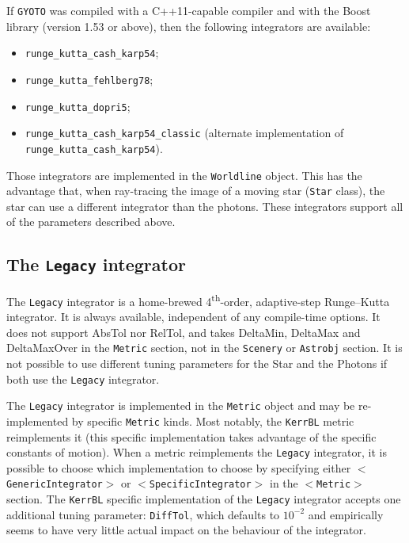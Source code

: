 \documentclass[a4paper,12pt]{article}
\begin{document}
If \texttt{GYOTO} was compiled with a C++11-capable compiler and with
the Boost library (version 1.53 or above), then the following
integrators are available:
\begin{itemize}
\item \texttt{runge\_kutta\_cash\_karp54};
\item \texttt{runge\_kutta\_fehlberg78};
\item \texttt{runge\_kutta\_dopri5};
\item \texttt{runge\_kutta\_cash\_karp54\_classic} (alternate
  implementation of\\ \texttt{runge\_kutta\_cash\_karp54}).
\end{itemize}

Those integrators are implemented in the \texttt{Worldline}
object. This has the advantage that, when ray-tracing the image of a
moving star (\texttt{Star} class), the star can use a different
integrator than the photons. These integrators support all of the
parameters described above.


\subsection{The \texttt{Legacy} integrator}

The \texttt{Legacy} integrator is a home-brewed
4\textsuperscript{th}-order, adaptive-step Runge--Kutta integrator. It
is always available, independent of any compile-time options. It does
not support AbsTol nor RelTol, and takes DeltaMin, DeltaMax and
DeltaMaxOver in the \texttt{Metric} section, not in the
\texttt{Scenery} or \texttt{Astrobj} section. It is not possible to
use different tuning parameters for the Star and the Photons if both
use the \texttt{Legacy} integrator.

The \texttt{Legacy} integrator is implemented in the \texttt{Metric}
object and may be re-implemented by specific \texttt{Metric}
kinds. Most notably, the \texttt{KerrBL} metric reimplements it (this
specific implementation takes advantage of the specific constants of
motion). When a metric reimplements the \texttt{Legacy} integrator, it
is possible to choose which implementation to choose by specifying
either \texttt{$<$GenericIntegrator$>$} or
\texttt{$<$SpecificIntegrator$>$} in the \texttt{$<$Metric$>$}
section. The \texttt{KerrBL} specific implementation of the
\texttt{Legacy} integrator accepts one additional tuning parameter:
\texttt{DiffTol}, which defaults to $10^{-2}$ and empirically seems to
have very little actual impact on the behaviour of the integrator.
\end{document}

